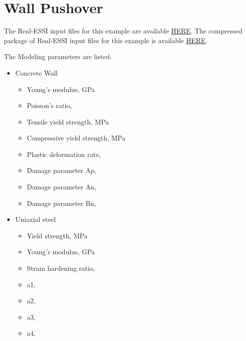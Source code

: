 \clearpage
\newpage
\section{ Wall Pushover}
\label{Wall_Pushover}



The Real-ESSI input files for this example are available 
\href{https://github.com/yuan-energy/Real-ESSI-Short-Course-Examples/tree/master/short-course-examples/Day3/Wall_Pushover}{HERE}. 
The compressed package of Real-ESSI input files for this example is available 
\href{https://github.com/yuan-energy/Real-ESSI-Short-Course-Examples/blob/master/short-course-examples/Day3/Wall_Pushover/Wall_Pushover.tgz?raw=true}{HERE}. 


The Modeling parameters are listed.
\begin{itemize}
  \item Concrete  Wall
  \begin{itemize}
    \item Young's modulus, \enspace {} GPa
    \item Poisson's ratio, \enspace {}
    \item Tensile yield strength, \enspace {} MPa
    \item Compressive yield strength, \enspace {} MPa
    \item Plastic deformation rate, \enspace {}
    \item Damage parameter Ap, \enspace {}
    \item Damage parameter An, \enspace {}
    \item Damage parameter Bn, \enspace {}
  \end{itemize}
  \item Uniaxial steel
  \begin{itemize}
    \item Yield strength, \enspace {} MPa
    \item Young's modulus, \enspace {} GPa
    \item Strain hardening ratio, \enspace {}
    \item a1, \enspace {}
    \item a2, \enspace {}
    \item a3, \enspace {}
    \item a4, \enspace {}
  \end{itemize}
\end{itemize}


